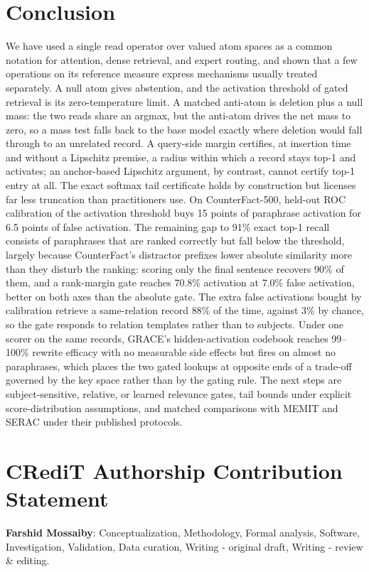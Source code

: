 \documentclass[preprint,12pt]{elsarticle}
\newif\ifmarkchanges
\newcommand{\rev}[1]{#1}
\newcommand{\revii}[1]{\ifmarkchanges{\color{blue}#1}\else#1\fi}
\begin{document}
\section{Conclusion}
\label{sec:conclusion}

We have used a single read operator over valued atom spaces as a common notation for attention, dense retrieval, and expert routing, \rev{and shown that a few operations on its reference measure express mechanisms usually treated separately. A null atom gives abstention, and the activation threshold of gated retrieval is its zero-temperature limit. A matched anti-atom is deletion plus a null mass\revii{: the two reads share an argmax, but the anti-atom drives the net mass to zero, so a mass test falls back to the base model exactly where deletion would fall through to an unrelated record}. A query-side margin certifies, at insertion time and without a Lipschitz premise, a radius within which a record stays top-1 and activates; an anchor-based Lipschitz argument, by contrast, cannot certify top-1 entry at all.} The exact softmax tail certificate holds by construction but licenses far less truncation than practitioners use. On CounterFact-500, held-out ROC calibration of the activation threshold buys 15 points of paraphrase activation for 6.5 points of false activation. \rev{The remaining gap to 91\% exact top-1 recall consists of paraphrases that are ranked correctly but fall below the threshold, largely because CounterFact's distractor prefixes lower absolute similarity more than they disturb the ranking: scoring only the final sentence recovers 90\% of them, and a rank-margin gate reaches 70.8\% activation at 7.0\% false activation, better on both axes than the absolute gate. The extra false activations bought by calibration retrieve a same-relation record 88\% of the time, against 3\% by chance, so the gate responds to relation templates rather than to subjects.} Under one scorer on the same records, GRACE's hidden-activation codebook reaches 99--100\% rewrite efficacy with no measurable side effects but fires on almost no paraphrases, which places the two gated lookups at opposite ends of a trade-off governed by the key space rather than by the gating rule. The next steps are subject-sensitive, relative, or learned relevance gates, tail bounds under explicit score-distribution assumptions, and matched comparisons with MEMIT and SERAC under their published protocols.

\section*{CRediT Authorship Contribution Statement}
\textbf{Farshid Mossaiby}: Conceptualization, Methodology, Formal analysis, Software, Investigation, Validation, Data curation, Writing - original draft, Writing - review \& editing.
\end{document}
